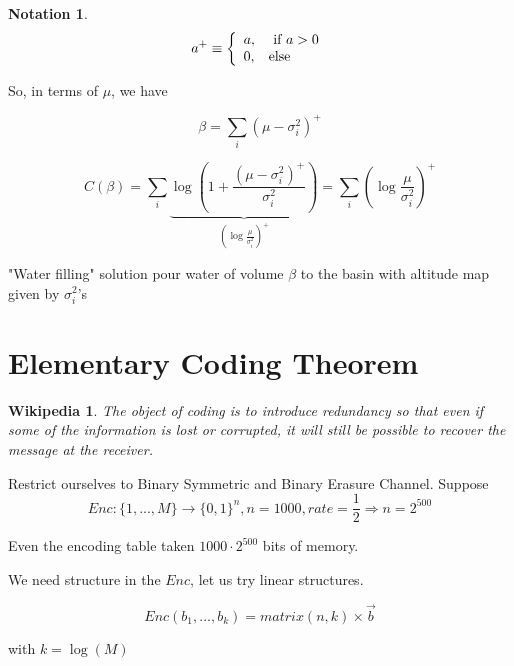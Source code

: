 \documentclass[twoside]{article}
\newtheorem*{wikipedia}{Wikipedia}
\newtheorem{notation}{Notation}
\theoremstyle{definition} %
\begin{document}
\begin{notation}
  \begin{align*}
    a^+ \equiv
    \left\{
    \begin{array}{l l}
      a, & \text{ if } a > 0 \\
      0, & \text{else}
    \end{array}
    \right.
  \end{align*}
\end{notation}

So, in terms of $\mu$, we have

\[
  \beta = \sum_i(\mu - \sigma^2_i)^+
\]

\[
  C(\beta) = \sum_i \underbrace{\log(1 + \frac{(\mu - \sigma_i^2)^+}{\sigma_i^2})}_{(\log \frac{\mu}{\sigma^2_i})^+} = \sum_i \left(\log \frac{\mu}{\sigma^2_i}\right)^+
\]

"Water filling" solution pour water of volume $\beta$ to the basin with altitude map given by $\sigma^2_i$'s



\cleardoublepage
\section{Elementary Coding Theorem}

\begin{wikipedia}
  The object of coding is to introduce redundancy so that even if some of the information is lost or corrupted, it will still be possible to recover the message at the receiver.
\end{wikipedia}

Restrict ourselves to Binary Symmetric and Binary Erasure Channel. Suppose
\[
  Enc: \{1, ..., M\} \rightarrow \{ 0, 1\}^n, n = 1000, rate = \frac{1}{2}
  \Rightarrow n = 2^{500}
\]

Even the encoding table taken $1000 \cdot 2^{500}$ bits of memory.

We need structure in the $Enc$, let us try linear structures.

\[
  Enc(b_1, ..., b_k) = matrix(n, k) \times \vec{b}
\]

with $k = \log(M)$
\end{document}
